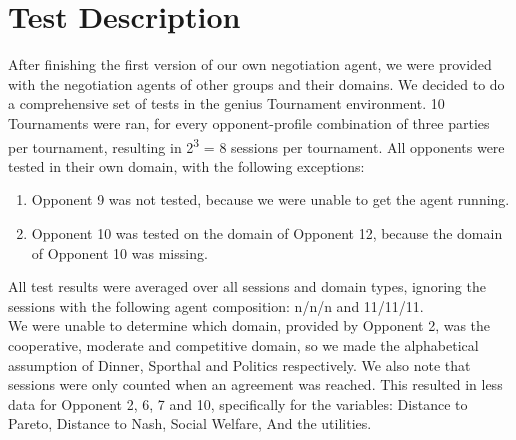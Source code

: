 \section{Test Description}

After finishing the first version of our own negotiation agent, we were provided with the negotiation agents of other groups and their domains. We decided to do a comprehensive set of tests in the genius Tournament environment. 10 Tournaments were ran, for every opponent-profile combination of three parties per tournament, resulting in 2\textsuperscript{3} = 8 sessions per tournament. All opponents were tested in their own domain, with the following exceptions:

\begin{enumerate}
	\item Opponent 9 was not tested, because we were unable to get the agent running. 
	\item Opponent 10 was tested on the domain of Opponent 12, because the domain of Opponent 10 was missing.
\end{enumerate}

All test results were averaged over all sessions and domain types, ignoring the sessions with the following agent composition: n/n/n and 11/11/11.\\

We were unable to determine which domain, provided by Opponent 2, was the cooperative, moderate and competitive domain, so we made the alphabetical assumption of Dinner, Sporthal and Politics respectively. We also note that sessions were only counted when an agreement was reached. This resulted in less data for Opponent 2, 6, 7 and 10, specifically for the variables: Distance to Pareto, Distance to Nash, Social Welfare, And the utilities.